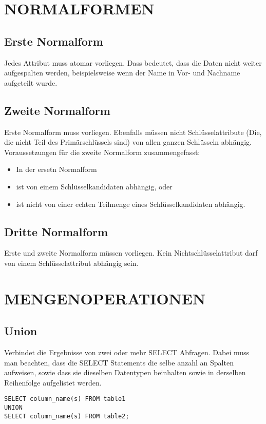 \documentclass[fleqn,10pt]{SelfArx} %
\begin{document}
\clearpage
\section{NORMALFORMEN}

\subsection{Erste Normalform}
Jedes Attribut muss atomar vorliegen. Dass bedeutet, dass die Daten nicht weiter aufgespalten werden, beispielsweise wenn der Name in Vor- und Nachname aufgeteilt wurde. 

\subsection{Zweite Normalform}
Erste Normalform muss vorliegen. Ebenfalls müssen nicht Schlüsselattribute (Die, die nicht Teil des Primärschlüssels sind) von allen ganzen Schlüsseln abhängig. Voraussetzungen für die zweite Normalform zusammengefasst:
\begin{itemize}
	\item In der ersetn Normalform
	\item ist von einem Schlüsselkandidaten abhängig, oder
	\item ist nicht von einer echten Teilmenge eines Schlüsselkandidaten abhängig.
\end{itemize}

\subsection{Dritte Normalform}
Erste und zweite Normalform müssen vorliegen. Kein Nichtschlüsselattribut darf von einem Schlüsselattribut abhängig sein.  

\section{MENGENOPERATIONEN}

\subsection{Union}
Verbindet die Ergebnisse von zwei oder mehr SELECT Abfragen. Dabei muss man beachten, dass die SELECT Statements die selbe anzahl an Spalten aufweisen, sowie dass sie dieselben Datentypen beinhalten sowie in derselben Reihenfolge aufgelistet werden.
\begin{verbatim}
SELECT column_name(s) FROM table1
UNION
SELECT column_name(s) FROM table2;
\end{verbatim}
\end{document}
